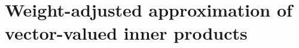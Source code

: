 \documentclass{siamart0216}
\newcommand{\LRp}[1]{\left( #1 \right)}
\newcommand{\jump}[1] {\ensuremath{\llbracket#1\rrbracket}}
\begin{document}
%



\section{Weight-adjusted approximation of vector-valued inner products}
\end{document}

